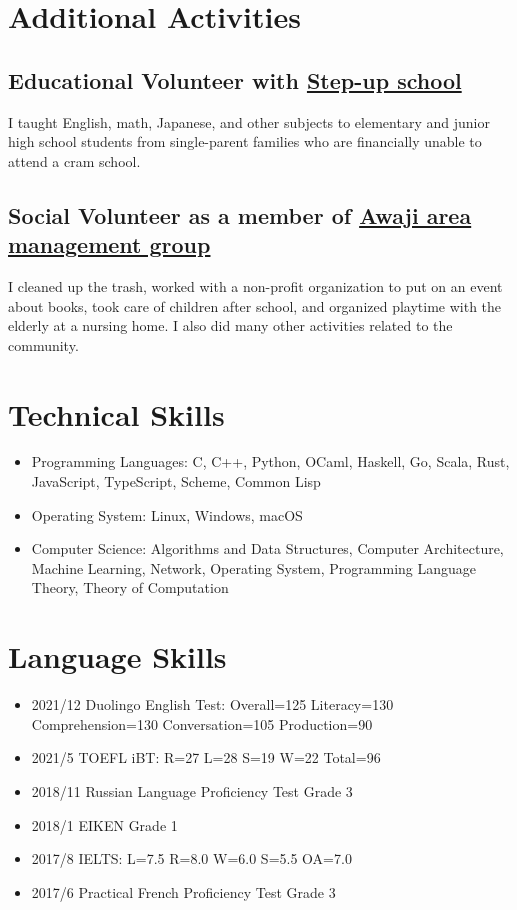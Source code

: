 \documentclass[12pt]{article}
\begin{document}
\section*{Additional Activities}
  \subsection*{Educational Volunteer with \href{https://stepup-unesco.com/}{Step-up school}}
    I taught English, math, Japanese, and other subjects to elementary and junior high school students from single-parent families who are financially unable to attend a cram school.
  \subsection*{Social Volunteer as a member of \href{https://www.waterras.com/awaji_am.html}{Awaji area management group}}
    I cleaned up the trash, worked with a non-profit organization to put on an event about books, took care of children after school, and organized playtime with the elderly at a nursing home.
    I also did many other activities related to the community.

\section*{Technical Skills}
  \begin{itemize}
    \item Programming Languages:
      C,
      C++,
      Python,
      OCaml,
      Haskell,
      Go,
      Scala,
      Rust,
      JavaScript,
      TypeScript,
      Scheme,
      Common Lisp
    \item Operating System:
      Linux,
      Windows,
      macOS
    \item Computer Science:
      Algorithms and Data Structures,
      Computer Architecture,
      Machine Learning,
      Network,
      Operating System,
      Programming Language Theory,
      Theory of Computation
  \end{itemize}

\section*{Language Skills}
  \begin{itemize}
    \item 2021/12 Duolingo English Test: Overall=125 Literacy=130 Comprehension=130 Conversation=105 Production=90
    \item 2021/5 TOEFL iBT: R=27 L=28 S=19 W=22 Total=96
    \item 2018/11 Russian Language Proficiency Test Grade 3
    \item 2018/1 EIKEN Grade 1
    \item 2017/8 IELTS: L=7.5 R=8.0 W=6.0 S=5.5 OA=7.0
    \item 2017/6 Practical French Proficiency Test Grade 3
  \end{itemize}
\end{document}
